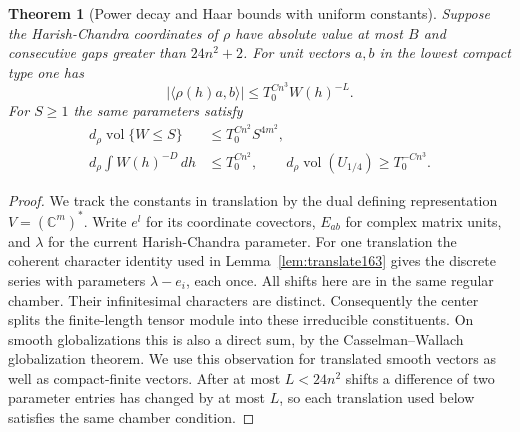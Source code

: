 \documentclass[a4paper,11pt]{article}
\newtheorem{theorem}[proposition]{Theorem}
\theoremstyle{definition}
\theoremstyle{remark}
\numberwithin{equation}{section}
\begin{document}
\begin{theorem}[Power decay and Haar bounds with uniform constants]
\label{thm:tensor249}
Suppose the Harish-Chandra coordinates of \(\rho\) have absolute
value at most \(B\) and consecutive gaps greater than \(24n^2+2\).
For unit vectors \(a,b\) in the lowest compact type one has
\[
 |\langle\rho(h)a,b\rangle|\le T_0^{C n^3} W(h)^{-L} .
\]
For \(S\ge1\) the same parameters satisfy
\[
 \begin{split}
 d_\rho\operatorname{vol}\{W\le S\}&\le T_0^{C n^2} S^{4m^2},\\
 d_\rho\int W(h)^{-D}\,dh&\le T_0^{C n^2},\qquad
 d_\rho\operatorname{vol}(U_{1/4})\ge T_0^{-C n^3} .
 \end{split}
\]
\end{theorem}
\begin{proof}
We track the constants in translation by the dual defining representation
\(V=(\mathbb C^m)^*\). Write \(e^l\) for its coordinate covectors,
\(E_{ab}\) for complex matrix units, and \(\lambda\) for the current
Harish-Chandra parameter. For one translation the coherent character
identity used in Lemma~\ref{lem:translate163} gives the discrete series
with parameters \(\lambda-e_i\), each once. All shifts here are in the
same regular chamber. Their infinitesimal characters are distinct.
Consequently the center splits the finite-length tensor module into
these irreducible constituents. On smooth globalizations this is also a
direct sum, by the Casselman--Wallach globalization theorem. We use
this observation for translated smooth vectors as well as compact-finite
vectors. After at most \(L<24n^2\) shifts a difference of two parameter
entries has changed by at most \(L\), so each translation used below
satisfies the same chamber condition.


\end{proof}
\end{document}

